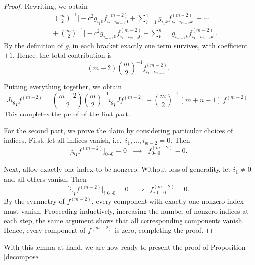 \documentclass[11pt,a4paper,reqno]{amsart}
\newcommand{\gc}{i_{g_{\frac{1}{c}}}}
\begin{document}
\begin{proof}
		Rewriting, we obtain
		\[
		\begin{aligned}
			&= \binom{m}{2}^{-1} \Big[ -c^2 g_{i_1 0} f^{(m-2)}_{i_2 \dots i_{m-2} 0} 
			+ \sum_{k=1}^n g_{i_1 k} f^{(m-2)}_{i_2 \dots i_{m-2} k} \Big] + \cdots \\
			&\quad + \binom{m}{2}^{-1} \Big[ -c^2 g_{i_{m-2} 0} f^{(m-2)}_{i_1 \dots i_{m-3} 0} 
			+ \sum_{k=1}^n g_{i_{m-2} k} f^{(m-2)}_{i_1 \dots i_{m-3} k} \Big].
		\end{aligned}
		\]
		By the definition of \(g\), in each bracket exactly one term survives, with coefficient \(+1\). Hence, the total contribution is
		\[
		(m-2)\binom{m}{2}^{-1} f^{(m-2)}_{i_1 \dots i_{m-2}}.
		\]
		
		Putting everything together, we obtain
		\[
		J \gc f^{(m-2)} 
		= \binom{m-2}{2}\binom{m}{2}^{-1} \gc J f^{(m-2)} 
		+ \binom{m}{2}^{-1} (m+n-1) \,f^{(m-2)}.
		\]
		This completes the proof of the first part.
		
		For the second part, we prove the claim by considering particular choices of indices.  
		First, let all indices vanish, i.e.\ \(i_1, \dots, i_{m-2} = 0\). Then  
		\[
		\big[ \gc f^{(m-2)} \big]_{0 \cdots 0} = 0 
		\;\;\implies\;\; f^{(m-2)}_{0 \cdots 0} = 0.
		\]
		
		Next, allow exactly one index to be nonzero. Without loss of generality, let \(i_1 \neq 0\) and all others vanish. Then  
		\[
		\big[ \gc f^{(m-2)} \big]_{i_1 0 \cdots 0} = 0 
		\;\;\implies\;\; f^{(m-2)}_{i_1 0 \cdots 0} = 0.
		\]
		By the symmetry of \(f^{(m-2)}\), every component with exactly one nonzero index must vanish. Proceeding inductively, increasing the number of nonzero indices at each step, the same argument shows that all corresponding components vanish. Hence, every component of \(f^{(m-2)}\) is zero, completing the proof.
	\end{proof}
With this lemma at hand, we are now ready to present the proof of Proposition \ref{decompose}.
\end{document}

